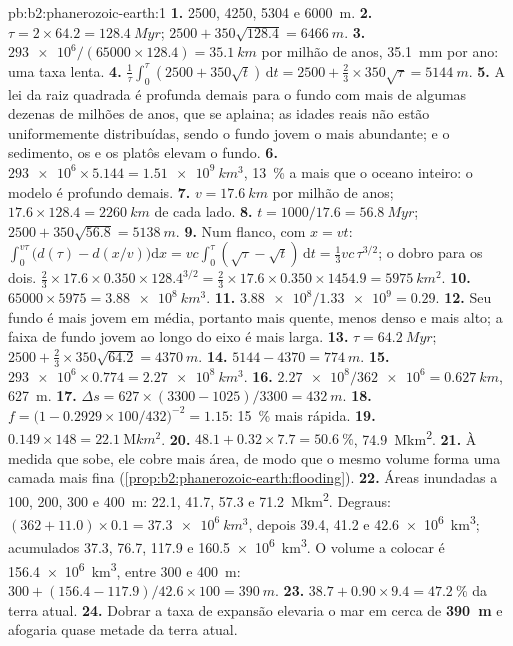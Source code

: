 \begin{solution}{pb:b2:phanerozoic-earth:1}
\textbf{1.} 2500, 4250, 5304 e \qty{6000}{m}.
\textbf{2.} $\tau = 2 \times 64.2 = \qty{128.4}{Myr}$; $2500 + 350\sqrt{128.4} = \qty{6466}{m}$.
\textbf{3.} $\num{293e6}/(65000 \times 128.4) = \qty{35.1}{km}$ por milhão de anos,
\qty{35.1}{mm} por ano: uma taxa lenta.
\textbf{4.} $\frac1\tau\int_0^\tau(2500 + 350\sqrt t)\,\mathrm{d}t = 2500 + \frac23 \times
350\sqrt\tau = \qty{5144}{m}$.
\textbf{5.} A lei da raiz quadrada é profunda demais para o fundo com mais de algumas dezenas de milhões de anos,
que se aplaina; as idades reais não estão uniformemente distribuídas, sendo o fundo jovem o mais abundante; e
o sedimento, os  e os platôs elevam o fundo.
\textbf{6.} $\num{293e6} \times 5.144 = \qty{1.51e9}{km^3}$, \qty{13}{\percent} a mais que o
oceano inteiro: o modelo é profundo demais.
\textbf{7.} $v = \qty{17.6}{km}$ por milhão de anos; $17.6 \times 128.4 = \qty{2260}{km}$ de
cada lado.
\textbf{8.} $t = 1000/17.6 = \qty{56.8}{Myr}$; $2500 + 350\sqrt{56.8} = \qty{5138}{m}$.
\textbf{9.} Num flanco, com $x = vt$: $\int_0^{v\tau}\bigl(d(\tau) - d(x/v)\bigr)\mathrm{d}x
= vc\int_0^\tau(\sqrt\tau - \sqrt t)\,\mathrm{d}t = \frac13 vc\,\tau^{3/2}$; o dobro para os dois.
$\frac23 \times 17.6 \times 0.350 \times 128.4^{3/2} = \frac23 \times 17.6 \times 0.350 \times
1454.9 = \qty{5975}{km^2}$.
\textbf{10.} $65000 \times 5975 = \qty{3.88e8}{km^3}$.
\textbf{11.} $\num{3.88e8}/\num{1.33e9} = 0.29$.
\textbf{12.} Seu fundo é mais jovem em média, portanto mais quente, menos denso e mais alto; a faixa de fundo
jovem ao longo do eixo é mais larga.
\textbf{13.} $\tau = \qty{64.2}{Myr}$; $2500 + \frac23 \times 350\sqrt{64.2} = \qty{4370}{m}$.
\textbf{14.} $5144 - 4370 = \qty{774}{m}$.
\textbf{15.} $\num{293e6} \times 0.774 = \qty{2.27e8}{km^3}$.
\textbf{16.} $\num{2.27e8}/\num{362e6} = \qty{0.627}{km}$, \qty{627}{m}.
\textbf{17.} $\Delta s = 627 \times (3300 - 1025)/3300 = \qty{432}{m}$.
\textbf{18.} $f = \bigl(1 - 0.2929 \times 100/432\bigr)^{-2} = 1.15$: \qty{15}{\percent} mais rápida.
\textbf{19.} $0.149 \times 148 = \qty{22.1}{\mega km^2}$.
\textbf{20.} $48.1 + 0.32 \times 7.7 = \qty{50.6}{\percent}$, \qty{74.9}{\mega km^2}.
\textbf{21.} À medida que sobe, ele cobre mais área, de modo que o mesmo volume forma uma camada mais fina
(\cref{prop:b2:phanerozoic-earth:flooding}).
\textbf{22.} Áreas inundadas a 100, 200, 300 e \qty{400}{m}: 22.1, 41.7, 57.3 e
\qty{71.2}{\mega km^2}. Degraus: $(362 + 11.0) \times 0.1 = \qty{37.3e6}{km^3}$, depois 39.4, 41.2
e \qty{42.6e6}{km^3}; acumulados 37.3, 76.7, 117.9 e \qty{160.5e6}{km^3}. O volume a colocar
é \qty{156.4e6}{km^3}, entre 300 e \qty{400}{m}: $300 + (156.4 - 117.9)/42.6 \times 100
= \qty{390}{m}$.
\textbf{23.} $38.7 + 0.90 \times 9.4 = \qty{47.2}{\percent}$ da terra atual.
\textbf{24.} Dobrar a taxa de expansão elevaria o mar em cerca de \textbf{\qty{390}{m}} e
afogaria quase metade da terra atual.
\end{solution}
